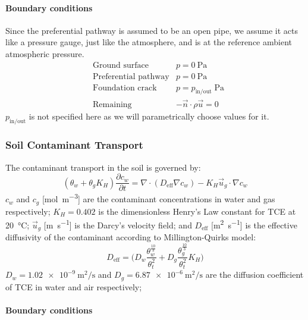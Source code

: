 \paragraph{Boundary conditions}

Since the preferential pathway is assumed to be an open pipe, we assume it acts like a pressure gauge, just like the atmosphere, and is at the reference ambient atmospheric pressure.
\begin{align*}
    &\text{Ground surface} &p = \SI{0}{\pascal} \\
    &\text{Preferential pathway} &p = \SI{0}{\pascal} \\
    &\text{Foundation crack} &p = p_\mathrm{in/out} \; \si{\pascal} \\
    &\text{Remaining} &-\vec{n}\cdot\rho\vec{u} = 0
\end{align*}
$p_\mathrm{in/out}$ is not specified here as we will parametrically choose values for it.\par

\subsubsection{Soil Contaminant Transport}

The contaminant transport in the soil is governed by:
\begin{equation*}
  (\theta_w + \theta_g K_H) \frac{\partial c_w}{\partial t} = \nabla \cdot (D_\mathrm{eff} \nabla c_w) - K_H \vec{u}_g \cdot \nabla c_w
\end{equation*}
$c_w$ and $c_g$ [\si{\mol\per\metre\cubed}] are the contaminant concentrations in water and gas respectively;
$K_H = 0.402$ is the dimensionless Henry's Law constant for TCE at \SI{20}{\degreeCelsius};
$\vec{u}_g$ [\si{\metre\per\second}] is the Darcy's velocity field;
and $D_\mathrm{eff}$ [\si{\metre\squared\per\second}] is the effective diffusivity of the contaminant according to Millington-Quirks model:
\begin{equation*}
  D_\mathrm{eff} = \Big(D_w \frac{\theta_w^{\frac{10}{3}}}{\theta_t^2} + D_g \frac{\theta_g^{\frac{10}{3}}}{\theta_t^2} K_H\Big)
\end{equation*}
$D_w = \SI{1.02e-9}{\metre\squared\per\second}$ and $D_g = \SI{6.87e-6}{\metre\squared\per\second}$ are the diffusion coefficient of TCE in water and air respectively;

\paragraph{Boundary conditions}

